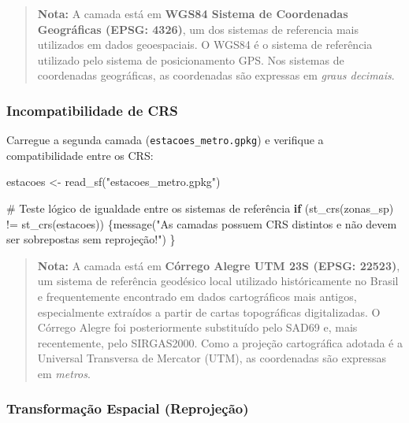 \documentclass[
  letterpaper,
  DIV=11,
  numbers=noendperiod]{scrreprt}
\newenvironment{Shaded}{\begin{snugshade}}{\end{snugshade}}
\newcommand{\CommentTok}[1]{\textcolor[rgb]{0.37,0.37,0.37}{#1}}
\newcommand{\ControlFlowTok}[1]{\textcolor[rgb]{0.00,0.23,0.31}{\textbf{#1}}}
\newcommand{\FunctionTok}[1]{\textcolor[rgb]{0.28,0.35,0.67}{#1}}
\newcommand{\NormalTok}[1]{\textcolor[rgb]{0.00,0.23,0.31}{#1}}
\newcommand{\OtherTok}[1]{\textcolor[rgb]{0.00,0.23,0.31}{#1}}
\newcommand{\SpecialCharTok}[1]{\textcolor[rgb]{0.37,0.37,0.37}{#1}}
\newcommand{\StringTok}[1]{\textcolor[rgb]{0.13,0.47,0.30}{#1}}
\begin{document}
\begin{quote}
\textbf{Nota:} A camada está em \textbf{WGS84 Sistema de Coordenadas
Geográficas (EPSG: 4326)}, um dos sistemas de referencia mais utilizados
em dados geoespaciais. O WGS84 é o sistema de referência utilizado pelo
sistema de posicionamento GPS. Nos sistemas de coordenadas geográficas,
as coordenadas são expressas em \emph{graus decimais}.
\end{quote}

\subsubsection{\texorpdfstring{\textbf{Incompatibilidade de
CRS}}{Incompatibilidade de CRS}}\label{incompatibilidade-de-crs}

Carregue a segunda camada (\texttt{estacoes\_metro.gpkg}) e verifique a
compatibilidade entre os CRS:

\begin{Shaded}
\begin{Highlighting}[]
\NormalTok{estacoes }\OtherTok{\textless{}{-}} \FunctionTok{read\_sf}\NormalTok{(}\StringTok{"estacoes\_metro.gpkg"}\NormalTok{)}

\CommentTok{\# Teste lógico de igualdade entre os sistemas de referência }
\ControlFlowTok{if}\NormalTok{ (}\FunctionTok{st\_crs}\NormalTok{(zonas\_sp) }\SpecialCharTok{!=} \FunctionTok{st\_crs}\NormalTok{(estacoes)) \{}\FunctionTok{message}\NormalTok{(}\StringTok{"As camadas possuem CRS distintos e não devem ser sobrepostas sem reprojeção!"}\NormalTok{) \} }
\end{Highlighting}
\end{Shaded}

\begin{quote}
\textbf{Nota:} A camada está em \textbf{Córrego Alegre UTM 23S (EPSG:
22523)}, um sistema de referência geodésico local utilizado
históricamente no Brasil e frequentemente encontrado em dados
cartográficos mais antigos, especialmente extraídos a partir de cartas
topográficas digitalizadas. O Córrego Alegre foi posteriormente
substituído pelo SAD69 e, mais recentemente, pelo SIRGAS2000. Como a
projeção cartográfica adotada é a Universal Transversa de Mercator
(UTM), as coordenadas são expressas em \emph{metros}.
\end{quote}

\subsubsection{\texorpdfstring{\textbf{Transformação Espacial
(Reprojeção)}}{Transformação Espacial (Reprojeção)}}\label{transformauxe7uxe3o-espacial-reprojeuxe7uxe3o}
\end{document}
